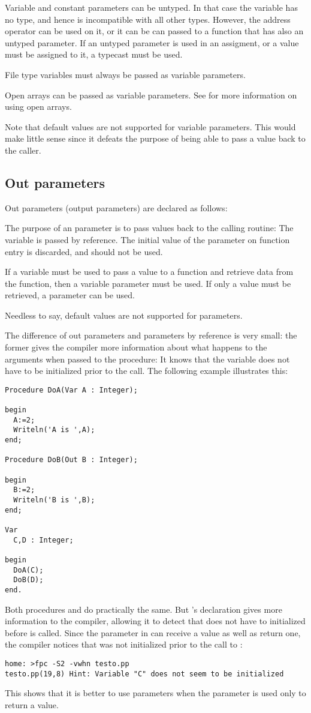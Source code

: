 Variable and constant parameters can be untyped. In that case the variable has no type,
and hence is incompatible with all other types. However, the address operator
can be used on it, or it can be can passed to a function that has also an
untyped parameter. If an untyped parameter is used in an assigment,
or a value must be assigned to it, a typecast must be used.

File type variables must always be passed as variable parameters.

Open arrays can be passed as variable parameters. See  for
more information on using open arrays.

Note that default values are not supported for variable parameters. This
would make little sense since it defeats the purpose of being able to pass a
value back to the caller.

\subsection{Out parameters}
\label{se:outparams}
Out parameters  (output parameters) are declared as follows:

The purpose of an  parameter is to pass values back to the calling
routine: The variable is passed by reference. The initial value of the 
parameter on function entry is discarded, and should not be used.

If a variable must be used to pass a value to a function and retrieve data
from the function, then a variable parameter must be used. If only a value
must be retrieved, a  parameter can be used.

Needless to say, default values are not supported for  parameters.

The difference of out parameters and parameters by reference is very small:
the former gives the compiler more information about what happens to the
arguments when passed to the procedure: It knows that the variable does not
have to be initialized prior to the call. The following example illustrates
this:
\begin{verbatim}
Procedure DoA(Var A : Integer);

begin
  A:=2;
  Writeln('A is ',A);
end;

Procedure DoB(Out B : Integer);

begin
  B:=2;
  Writeln('B is ',B);
end;

Var
  C,D : Integer;

begin
  DoA(C);
  DoB(D);
end.
\end{verbatim}
Both procedures  and  do practically the same. But
's declaration gives more information to the compiler, allowing
it to detect that  does not have to initialized before 
is called. Since the parameter  in  can receive a value as
well as return one, the compiler notices that  was not initialized
prior to the call to :
\begin{verbatim}
home: >fpc -S2 -vwhn testo.pp
testo.pp(19,8) Hint: Variable "C" does not seem to be initialized
\end{verbatim}
This shows that it is better to use  parameters when the parameter
is used only to return a value.

